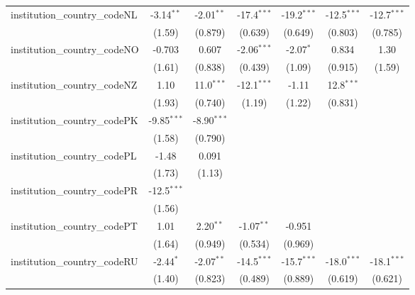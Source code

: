 \begin{tabular}{lcccccc}
   institution\_country\_codeNL          & -3.14$^{**}$  & -2.01$^{**}$  & -17.4$^{***}$ & -19.2$^{***}$ & -12.5$^{***}$ & -12.7$^{***}$\\   
                                         & (1.59)        & (0.879)       & (0.639)       & (0.649)       & (0.803)       & (0.785)\\   
   institution\_country\_codeNO          & -0.703        & 0.607         & -2.06$^{***}$ & -2.07$^{*}$   & 0.834         & 1.30\\   
                                         & (1.61)        & (0.838)       & (0.439)       & (1.09)        & (0.915)       & (1.59)\\   
   institution\_country\_codeNZ          & 1.10          & 11.0$^{***}$  & -12.1$^{***}$ & -1.11         & 12.8$^{***}$  &   \\   
                                         & (1.93)        & (0.740)       & (1.19)        & (1.22)        & (0.831)       &   \\   
   institution\_country\_codePK          & -9.85$^{***}$ & -8.90$^{***}$ &               &               &               &   \\   
                                         & (1.58)        & (0.790)       &               &               &               &   \\   
   institution\_country\_codePL          & -1.48         & 0.091         &               &               &               &   \\   
                                         & (1.73)        & (1.13)        &               &               &               &   \\   
   institution\_country\_codePR          & -12.5$^{***}$ &               &               &               &               &   \\   
                                         & (1.56)        &               &               &               &               &   \\   
   institution\_country\_codePT          & 1.01          & 2.20$^{**}$   & -1.07$^{**}$  & -0.951        &               &   \\   
                                         & (1.64)        & (0.949)       & (0.534)       & (0.969)       &               &   \\   
   institution\_country\_codeRU          & -2.44$^{*}$   & -2.07$^{**}$  & -14.5$^{***}$ & -15.7$^{***}$ & -18.0$^{***}$ & -18.1$^{***}$\\   
                                         & (1.40)        & (0.823)       & (0.489)       & (0.889)       & (0.619)       & (0.621)\\   

\end{tabular}
